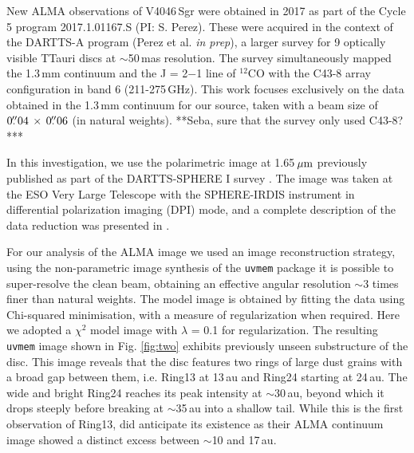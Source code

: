 \documentclass[letters,usenatbib,times]{mnras}
\begin{document}

New ALMA observations of V4046\,Sgr were obtained in 2017 as part of the Cycle 5 program 2017.1.01167.S (PI: S. Perez). These were acquired in the context of the DARTTS-A program (Perez et al. {\em in prep}), a larger survey for 9 optically visible TTauri discs at $\sim$50\,mas resolution. The survey simultaneously mapped the 1.3\,mm continuum and the J = 2$-$1 line of $^{12}$CO with the C43-8 array configuration in band 6 (211-275\,GHz). This work focuses exclusively on the data obtained in the 1.3\,mm continuum for our source, taken with a beam size of $0\hbox{$.\!\!^{\prime\prime}$}04 \,\times \, 0\hbox{$.\!\!^{\prime\prime}$}06$ (in natural weights). **Seba, sure that the survey only used C43-8?***

In this investigation, we use the polarimetric image at 1.65\,$\hbox{$\mu$m}$ previously published as part of the DARTTS-SPHERE I survey \citep{Avenhaus_2018}. The image was taken at the ESO Very Large Telescope with the SPHERE-IRDIS instrument in differential polarization imaging (DPI) mode, and a complete description of the data reduction was presented in \citet{Avenhaus_2018}. 

For our analysis of the ALMA image we used an image reconstruction strategy, using the non-parametric image synthesis of the {\tt uvmem} package \citep{2006ApJ...639..951C, 2018A&C....22...16C} it is possible to super-resolve the clean beam, obtaining an effective angular resolution $\sim$3 times finer than natural weights. The model image is obtained by fitting the data using Chi-squared minimisation, with a measure of regularization when required. Here we adopted a $\chi^2$ model image with $\lambda$ = 0.1 for regularization. The resulting {\tt uvmem} image shown in Fig. \ref{fig:two} exhibits previously unseen substructure of the disc. This image reveals that the disc features two rings of large dust grains with a broad gap between them, i.e. Ring13 at 13\,au and Ring24 starting at 24\,au. The wide and bright Ring24 reaches its peak intensity at $\sim$30\,au, beyond which it drops steeply before breaking at $\sim$35\,au into a shallow tail. While this is the first observation of Ring13, \citet{Ru_z_Rodr_guez_2019} did anticipate its existence as their ALMA continuum image showed a distinct excess between
$\sim$10 and 17\,au.
\end{document}
